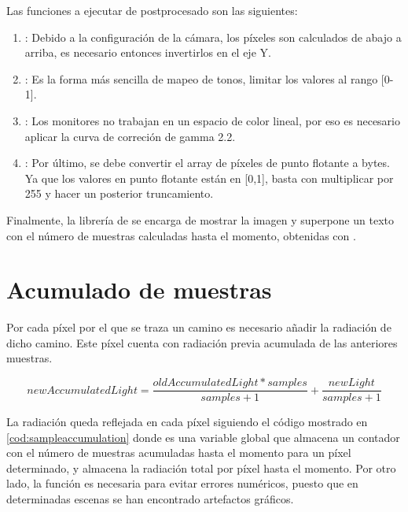 Las funciones a ejecutar de postprocesado son las siguientes:

\begin{enumerate}
	
	\item {}: Debido a la configuración de la cámara, los píxeles son calculados de abajo a arriba, es necesario entonces invertirlos en el eje Y.
	\item {}: Es la forma más sencilla de mapeo de tonos, limitar los valores al rango [0-1].
	\item {}: Los monitores no trabajan en un espacio de color lineal, por eso es necesario aplicar la curva de correción de gamma 2.2.
	\item {}: Por último, se debe convertir el array de píxeles de punto flotante a bytes. Ya que los valores en punto flotante están en [0,1], basta con multiplicar por 255 y hacer un posterior truncamiento.

\end{enumerate}

Finalmente, la librería de  se encarga de mostrar la imagen y superpone un texto con el número de muestras calculadas hasta el momento, obtenidas con .

\section{Acumulado de muestras}
	
Por cada píxel por el que se traza un camino es necesario añadir la radiación de dicho camino. Este píxel cuenta con radiación previa acumulada de las anteriores muestras.

\[{newAccumulatedLight = \frac{oldAccumulatedLight * samples}{samples + 1} + \frac{newLight}{samples + 1}}\]
	
La radiación queda reflejada en cada píxel siguiendo el código mostrado en \autoref{cod:sampleaccumulation} donde  es una variable global que almacena un contador con el número de muestras acumuladas hasta el momento para un píxel determinado, y  almacena la radiación total por píxel hasta el momento. Por otro lado, la función  es necesaria para evitar errores numéricos, puesto que en determinadas escenas se han encontrado artefactos gráficos.

